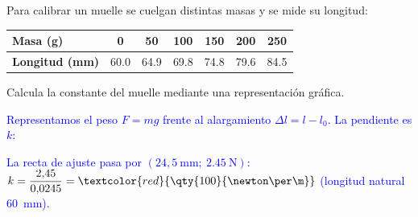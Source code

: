 \begin{exercise}
    Para calibrar un muelle se cuelgan distintas masas y se mide su longitud:
    \begin{center}
        \begin{tabular}{@{}lcccccc@{}}
            \toprule
            \textbf{Masa (\unit{\g})} & 0 & 50 & 100 & 150 & 200 & 250 \\
            \midrule
            \textbf{Longitud (\unit{\mm})} & \num{60.0} & \num{64.9} & \num{69.8} & \num{74.8} & \num{79.6} & \num{84.5} \\
            \bottomrule
        \end{tabular}
    \end{center}
    Calcula la constante del muelle mediante una representación gráfica.
    \begin{solu}
        \textcolor{blue}{Representamos el peso \(F = mg\) frente al alargamiento \(\Delta l = l - l_0\). La pendiente es \(k\):}
        \begin{center}
        \end{center}
        \textcolor{blue}{La recta de ajuste pasa por \((24{,}5\ \unit{\mm};\ \qty{2.45}{\newton})\):}
        \(k = \dfrac{2{,}45}{0{,}0245} = \textcolor{red}{\qty{100}{\newton\per\m}}\) \textcolor{blue}{(longitud natural \qty{60}{\mm}).}
    \end{solu}
\end{exercise}

